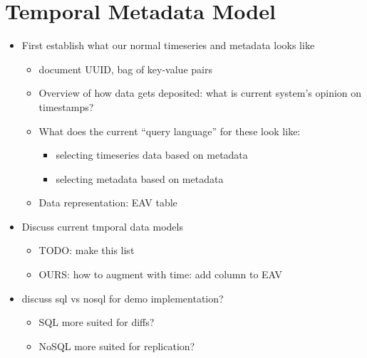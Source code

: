\section{Temporal Metadata Model}

\begin{itemize}
\item First establish what our normal timeseries and metadata looks like
  \begin{itemize}
  \item document UUID, bag of key-value pairs
  \item Overview of how data gets deposited: what is current system's opinion on timestamps?
  \item What does the current ``query language'' for these look like:
      \begin{itemize}
      \item selecting timeseries data based on metadata
      \item selecting metadata based on metadata
      \end{itemize}
  \item Data representation: EAV table
  \end{itemize}
\item Discuss current tmporal data models
    \begin{itemize}
    \item TODO: make this list
    \item OURS: how to augment with time: add column to EAV
    \end{itemize}
\item discuss sql vs nosql for demo implementation?
    \begin{itemize}
    \item SQL more suited for diffs?
    \item NoSQL more suited for replication?
    \end{itemize}
\end{itemize}
